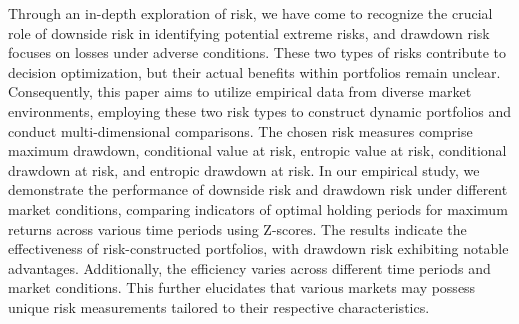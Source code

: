 
\begin{Abstrakt}
    Through an in-depth exploration of risk, we have come to recognize the crucial role of downside risk in identifying potential extreme risks, and drawdown risk focuses on losses under adverse conditions. These two types of risks contribute to decision optimization, but their actual benefits within portfolios remain unclear. Consequently, this paper aims to utilize empirical data from diverse market environments, employing these two risk types to construct dynamic portfolios and conduct multi-dimensional comparisons. The chosen risk measures comprise maximum drawdown, conditional value at risk, entropic value at risk, conditional drawdown at risk, and entropic drawdown at risk. In our empirical study, we demonstrate the performance of downside risk and drawdown risk under different market conditions, comparing indicators of optimal holding periods for maximum returns across various time periods using Z-scores. The results indicate the effectiveness of risk-constructed portfolios, with drawdown risk exhibiting notable advantages. Additionally, the efficiency varies across different time periods and market conditions. This further elucidates that various markets may possess unique risk measurements tailored to their respective characteristics.
\end{Abstrakt}



\clearpage
